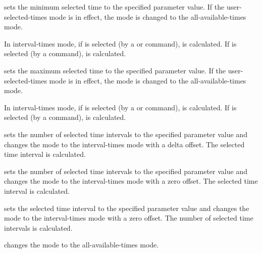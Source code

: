  {
 sets the minimum selected time  to the specified
parameter value. If the user-selected-times mode is in effect, the mode
is changed to the all-available-times mode.

In interval-times mode, if  is selected (by a 
or  command),  is calculated. If  is
selected (by a  command),  is calculated.
}

 {
 sets the maximum selected time  to the specified
parameter value. If the user-selected-times mode is in effect, the mode
is changed to the all-available-times mode.

In interval-times mode, if  is selected (by a 
or  command),  is calculated. If  is
selected (by a  command),  is calculated.
}

 {
 sets the number of selected time intervals  to
the specified parameter value and changes the mode to the interval-times
mode with a delta offset. The selected time interval  is
calculated.
}

 {
 sets the number of selected time intervals  to
the specified parameter value and changes the mode to the interval-times
mode with a zero offset. The selected time interval  is
calculated.
}

 {
 sets the selected time interval  to the
specified parameter value and changes the mode to the interval-times
mode with a zero offset. The number of selected time intervals
 is calculated.
}

 {
 changes the mode to the all-available-times mode.
}

